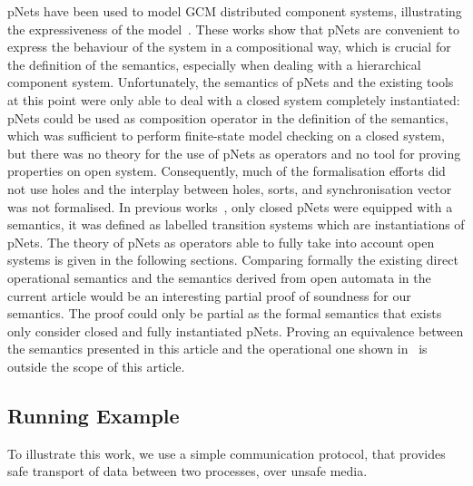 \documentclass{elsarticle}
\begin{document}
pNets have been used to model GCM distributed component systems, illustrating the expressiveness of the model~\cite{AmeurBoulifa2017}. 
These works show that pNets are convenient to express the behaviour of the system in a compositional way, which is crucial for the definition of the semantics, especially when dealing with a hierarchical component system. 
Unfortunately, the semantics of pNets and the existing tools at this point were only able to deal with a closed system completely instantiated: pNets could be used as composition operator in the definition of the semantics, which was sufficient to perform finite-state model checking on a closed system, but there was no theory for the use of pNets as operators and no tool for proving properties on open system. 
Consequently, much of the formalisation efforts did not use holes and the interplay between holes, sorts, and synchronisation vector was not formalised.
In previous works~\cite{AmeurBoulifa2017}, only closed pNets were equipped with a semantics, it was defined as labelled transition systems which are instantiations of pNets. 
The theory of pNets as operators able to fully take into account open systems is given in the following sections. Comparing formally the existing direct operational semantics and the semantics derived from open automata in the current article would be an interesting partial proof of soundness for our semantics. The proof could only be partial as the formal semantics that exists only consider closed and fully instantiated pNets. Proving 
an equivalence between the semantics presented in this article and the operational one shown in~\cite{AmeurBoulifa2017} is outside the scope of this article.



\subsection{Running Example}
To illustrate this work, we use a simple communication protocol, that provides safe transport of data between two processes, over unsafe media. 
\end{document}
